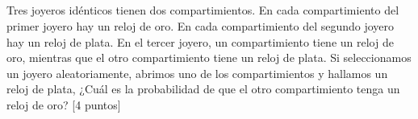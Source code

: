 \documentclass{cdplf-prueba}
\begin{document}


%

\subsection{} Tres joyeros idénticos tienen dos compartimientos. 
En cada compartimiento del primer joyero hay un reloj de oro. 
En cada compartimiento del segundo joyero hay un reloj de plata. 
En el tercer joyero, un compar\-timien\-to tiene un reloj de oro, 
mientras que el otro compartimiento tiene un reloj de plata. Si seleccionamos un joyero 
aleatoriamente, abrimos uno de los compartimientos y hallamos un reloj de plata, 
¿Cuál es la probabilidad de que el otro compartimiento tenga un reloj de oro? [4 puntos]


\begin{desarrollo}[height=14cm]
\end{desarrollo}
\begin{respuesta}[height=2cm]
\end{respuesta}


\end{document}
